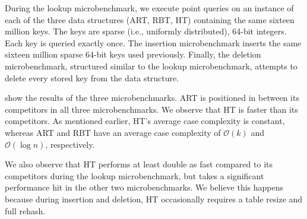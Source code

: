 \documentclass[abstracton,12pt]{scrartcl}
\theoremstyle{definition}
\begin{document}
During the lookup microbenchmark, we execute point queries on an instance
of each of the three data structures (ART, RBT, HT)
containing the same sixteen million keys. The keys are sparse (i.e., uniformly
distributed), 64-bit integers. Each key is queried exactly once.
The insertion microbenchmark inserts the same sixteen million sparse 64-bit keys
used previously. Finally, the deletion microbenchmark, structured similar to 
the lookup microbenchmark, attempts to delete every stored key from the data 
structure.

show the results of the three microbenchmarks. ART is positioned in between 
its competitors in all three microbenchmarks.
We observe that HT is faster than its competitors. As mentioned earlier, HT's
average case complexity is constant, whereas ART and RBT have an average case
complexity of $\mathcal{O}(k)$ and $\mathcal{O}(\log{}n)$, respectively.

We also observe that HT performs at least double as fast compared to its
competitors during the lookup microbenchmark, but takes a significant
performance hit in the other two microbenchmarks. We believe this happens 
because during insertion and deletion, HT occasionally requires a table resize 
and full rehash.
\end{document}
